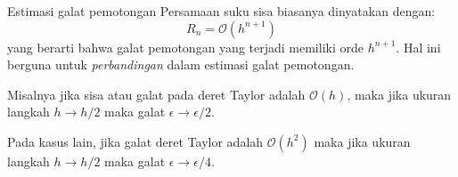 \begin{frame}{Estimasi galat pemotongan}
Persamaan suku sisa biasanya dinyatakan dengan:
$$
R_{n} = \mathcal{O}(h^{n+1})
$$
yang berarti bahwa galat pemotongan yang terjadi memiliki orde $h^{n+1}$. Hal ini
berguna untuk \textit{perbandingan} dalam estimasi galat pemotongan.

Misalnya jika sisa atau galat pada deret Taylor adalah $\mathcal{O}(h)$, maka
jika ukuran langkah $h \rightarrow h/2$ maka galat $\epsilon \rightarrow \epsilon/2$. 

Pada kasus lain, jika galat deret Taylor adalah $\mathcal{O}(h^2)$ maka
jika ukuran langkah $h \rightarrow h/2$ maka galat $\epsilon \rightarrow \epsilon/4$.

\end{frame}
